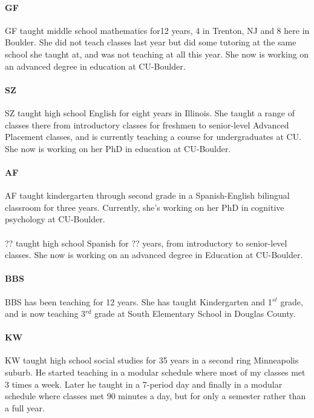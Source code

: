\paragraph{GF} GF taught middle school mathematics for12 years, 4 in Trenton, NJ
and 8 here in Boulder.  She did not teach classes last year but did some
tutoring at the same school she taught at, and was not teaching at all this
year. She now is working on an advanced degree in education at CU-Boulder.

\paragraph{SZ} SZ taught high school English for eight years in Illinois.  She
taught a range of classes there from introductory classes for freshmen to
senior-level Advanced Placement classes, and is currently teaching a course for
undergraduates at CU.  She now is working on her PhD in education at CU-Boulder.

\paragraph{AF} AF taught kindergarten through second grade in a Spanish-English
bilingual classroom for three years.  Currently, she's working on her PhD in
cognitive psychology at CU-Boulder.

\paragraph{} ?? taught high school Spanish for ??  years, from introductory to
senior-level classes.  She now is working on an advanced degree in Education at
CU-Boulder.

\paragraph{BBS} BBS has been teaching for 12 years. She has taught Kindergarten
and 1$^{st}$ grade, and is now teaching 3$^{rd}$ grade at South Elementary
School in Douglas County.

\paragraph{KW} KW taught high school social studies for 35 years in a second
ring Minneapolis suburb. He started teaching in a modular schedule where most of
my classes met 3 times a week. Later he taught in a 7-period day and finally in
a modular schedule where classes met 90 minutes a day, but for only a semester
rather than a full year.

